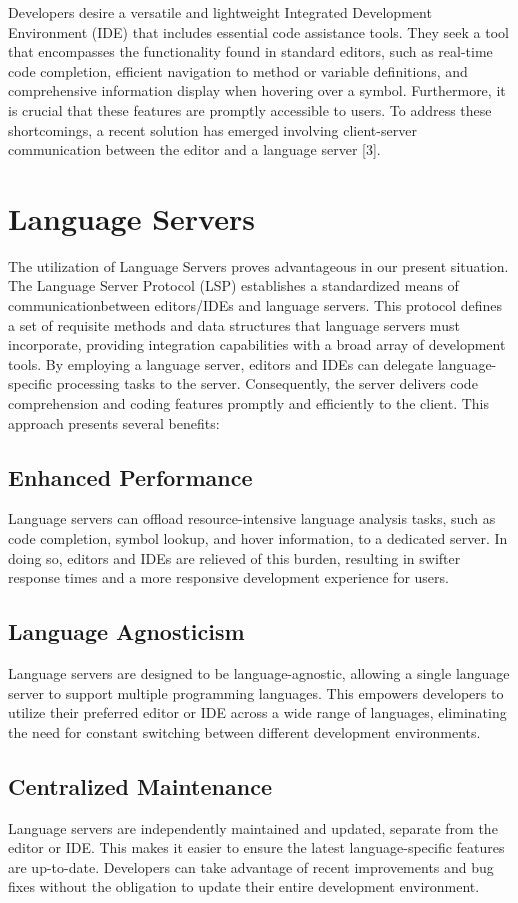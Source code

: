 \documentclass[12pt,a4paper,article]{memoir} %
\begin{document}
Developers desire a versatile and lightweight Integrated Development Environment (IDE) that includes essential code assistance tools. They seek a tool that encompasses the functionality found in standard editors, such as real-time code completion, efficient navigation to method or variable definitions, and comprehensive information display when hovering over a symbol. Furthermore, it is crucial that these features are promptly accessible to users. To address these shortcomings, a recent solution has emerged involving client-server communication between the editor and a language server [3].

\section{Language Servers} The utilization of Language Servers proves advantageous in our present situation. The Language Server Protocol (LSP) establishes a standardized means of communication\@  between editors/IDEs and language servers. This protocol defines a set of requisite methods and data structures that language servers must incorporate, providing integration capabilities with a broad array of development tools.
By employing a language server, editors and IDEs can delegate language-specific processing tasks to the server. Consequently, the server delivers code comprehension and coding features promptly and efficiently to the client. This approach presents several benefits:
\subsection{Enhanced Performance} Language servers can offload resource-intensive language analysis tasks, such as code completion, symbol lookup, and hover information, to a dedicated server. In doing so, editors and IDEs are relieved of this burden, resulting in swifter response times and a more responsive development experience for users.
\subsection{Language Agnosticism} Language servers are designed to be language-agnostic, allowing a single language server to support multiple programming languages. This empowers developers to utilize their preferred editor or IDE across a wide range of languages, eliminating the need for constant switching between different development environments.
\subsection{Centralized Maintenance} Language servers are independently maintained and updated, separate from the editor or IDE. This makes it easier to ensure the latest language-specific features are up-to-date. Developers can take advantage of recent improvements and bug fixes without the obligation to update their entire development environment.
\end{document}
